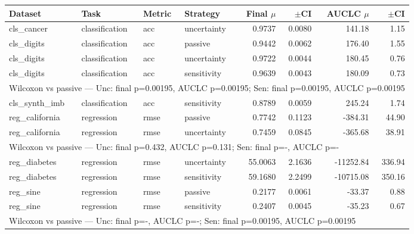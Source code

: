 \begin{tabular}{llllrrrr}
\toprule
Dataset & Task & Metric & Strategy & Final $\mu$ & $\pm$CI & AUCLC $\mu$ & $\pm$CI \\
\midrule
cls_cancer & classification & acc & uncertainty & 0.9737 & 0.0080 & 141.18 & 1.15 \\
\midrule
cls_digits & classification & acc & passive & 0.9442 & 0.0062 & 176.40 & 1.55 \\
cls_digits & classification & acc & uncertainty & 0.9722 & 0.0044 & 180.45 & 0.76 \\
cls_digits & classification & acc & sensitivity & 0.9639 & 0.0043 & 180.09 & 0.73 \\
\multicolumn{8}{l}{\footnotesize Wilcoxon vs passive — Unc: final p=0.00195, AUCLC p=0.00195; Sen: final p=0.00195, AUCLC p=0.00195}\\
\midrule
cls_synth_imb & classification & acc & sensitivity & 0.8789 & 0.0059 & 245.24 & 1.74 \\
\midrule
reg_california & regression & rmse & passive & 0.7742 & 0.1123 & -384.31 & 44.90 \\
reg_california & regression & rmse & uncertainty & 0.7459 & 0.0845 & -365.68 & 38.91 \\
\multicolumn{8}{l}{\footnotesize Wilcoxon vs passive — Unc: final p=0.432, AUCLC p=0.131; Sen: final p=-, AUCLC p=-}\\
\midrule
reg_diabetes & regression & rmse & uncertainty & 55.0063 & 2.1636 & -11252.84 & 336.94 \\
reg_diabetes & regression & rmse & sensitivity & 59.1680 & 2.2499 & -10715.08 & 350.16 \\
\midrule
reg_sine & regression & rmse & passive & 0.2177 & 0.0061 & -33.37 & 0.88 \\
reg_sine & regression & rmse & sensitivity & 0.2407 & 0.0045 & -35.23 & 0.67 \\
\multicolumn{8}{l}{\footnotesize Wilcoxon vs passive — Unc: final p=-, AUCLC p=-; Sen: final p=0.00195, AUCLC p=0.00195}\\
\midrule
\bottomrule
\end{tabular}
